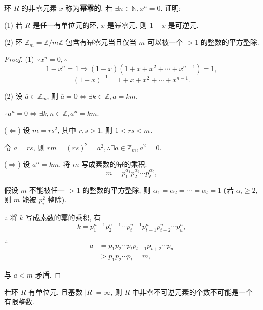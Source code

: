 \documentclass{ctexart}
\begin{document}
\begin{exercise}[3.8]
    环 $R$ 的非零元素 $x$ 称为\textbf{幂零的}, 若 $\exists n\in\mathbb{N},x^n=0$. 证明:

    (1) 若 $R$ 是任一有单位元的环, $x$ 是幂零元, 则 $1-x$ 是可逆元.

    (2) 环 $\mathbb{Z}_m=\mathbb{Z}/m\mathbb{Z}$ 包含有幂零元当且仅当 $m$ 可以被一个 $>1$ 的整数的平方整除.
\end{exercise}
\begin{proof}
    (1) $\because x^n=0,\therefore$
    \[1-x^n=1\Rightarrow(1-x)(1+x+x^2+\cdots+x^{n-1})=1,\]
    \[(1-x)^{-1}=1+x+x^2+\cdots+x^{n-1}.\]

    (2) 设 $\overline{a}\in\mathbb{Z}_m$, 则 $\overline{a}=0\Leftrightarrow\exists k\in\mathbb{Z},a=km$.

    $\therefore\overline{a}^n=0\Leftrightarrow\exists k,n\in\mathbb{Z},a^n=km$.

    ($\Leftarrow$) 设 $m=rs^2$, 其中 $r,s>1$. 则 $1<rs<m$.

    令 $a=rs$, 则 $rm=(rs)^2=a^2,\therefore\exists\overline{a}\in\mathbb{Z}_m,\overline{a}^2=0$.

    ($\Rightarrow$) 设 $a^n=km$. 将 $m$ 写成素数的幂的乘积:
    \[m=p_1^{\alpha_1}p_2^{\alpha_2}\cdots p_t^{\alpha_t},\]

    假设 $m$ 不能被任一 $>1$ 的整数的平方整除, 则 $\alpha_1=\alpha_2=\cdots=\alpha_t=1$ (若 $\alpha_i\geq2$, 则 $m$ 能被 $p_i^2$ 整除).

    $\therefore$ 将 $k$ 写成素数的幂的乘积, 有
    \[k=p_1^{n-1}p_2^{n-1}\cdots p_t^{n-1}p_{t+1}^np_{t+2}^n\cdots p_u^n,\]

    $\therefore$
    \begin{align*}
        a & =p_1p_2\cdots p_tp_{t+1}p_{t+2}\cdots p_u \\
        & >p_1p_2\cdots p_t=m,
    \end{align*}

    与 $a<m$ 矛盾.
\end{proof}
\begin{exercise}[3.9]
    若环 $R$ 有单位元, 且基数 $|R|=\infty$, 则 $R$ 中非零不可逆元素的个数不可能是一个有限整数.
\end{exercise}
\end{document}
